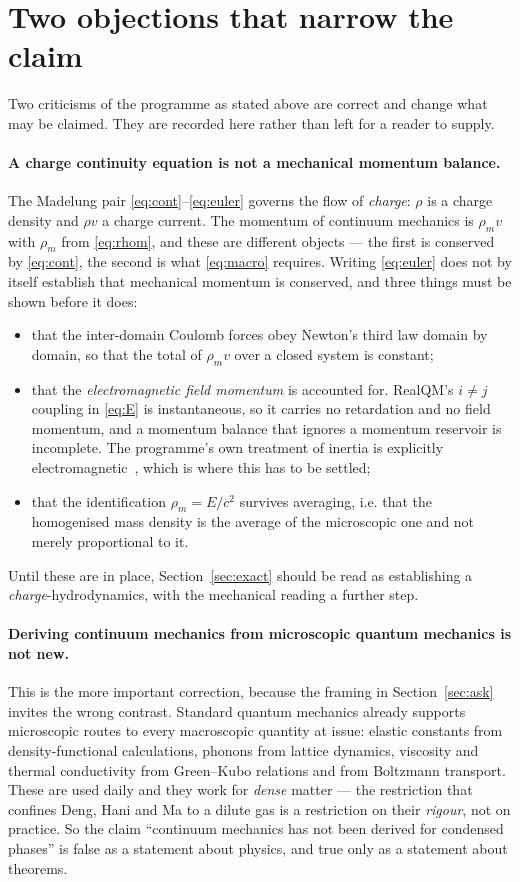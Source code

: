 \documentclass[11pt]{article}
\begin{document}
\section{Two objections that narrow the claim}\label{sec:objections}

Two criticisms of the programme as stated above are correct and change what may be claimed. They
are recorded here rather than left for a reader to supply.

\paragraph{A charge continuity equation is not a mechanical momentum balance.} The Madelung pair
\eqref{eq:cont}--\eqref{eq:euler} governs the flow of \emph{charge}: $\rho$ is a charge density and
$\rho v$ a charge current. The momentum of continuum mechanics is $\rho_m v$ with $\rho_m$ from
\eqref{eq:rhom}, and these are different objects --- the first is conserved by \eqref{eq:cont},
the second is what \eqref{eq:macro} requires. Writing \eqref{eq:euler} does not by itself establish
that mechanical momentum is conserved, and three things must be shown before it does:
\begin{itemize}\itemsep3pt
\item that the inter-domain Coulomb forces obey Newton's third law domain by domain, so that the
total of $\rho_m v$ over a closed system is constant;
\item that the \emph{electromagnetic field momentum} is accounted for. RealQM's $i\neq j$ coupling in
\eqref{eq:E} is instantaneous, so it carries no retardation and no field momentum, and a momentum
balance that ignores a momentum reservoir is incomplete. The programme's own treatment of inertia is
explicitly electromagnetic~\cite{nomass}, which is where this has to be settled;
\item that the identification $\rho_m = E/c^2$ survives averaging, i.e. that the homogenised mass
density is the average of the microscopic one and not merely proportional to it.
\end{itemize}
Until these are in place, Section~\ref{sec:exact} should be read as establishing a
\emph{charge}-hydrodynamics, with the mechanical reading a further step.

\paragraph{Deriving continuum mechanics from microscopic quantum mechanics is not new.} This is the
more important correction, because the framing in Section~\ref{sec:ask} invites the wrong contrast.
Standard quantum mechanics already supports microscopic routes to every macroscopic quantity at
issue: elastic constants from density-functional calculations, phonons from lattice dynamics,
viscosity and thermal conductivity from Green--Kubo relations and from Boltzmann transport. These
are used daily and they work for \emph{dense} matter --- the restriction that confines Deng, Hani
and Ma to a dilute gas is a restriction on their \emph{rigour}, not on practice. So the claim
``continuum mechanics has not been derived for condensed phases'' is false as a statement about
physics, and true only as a statement about theorems.
\end{document}

